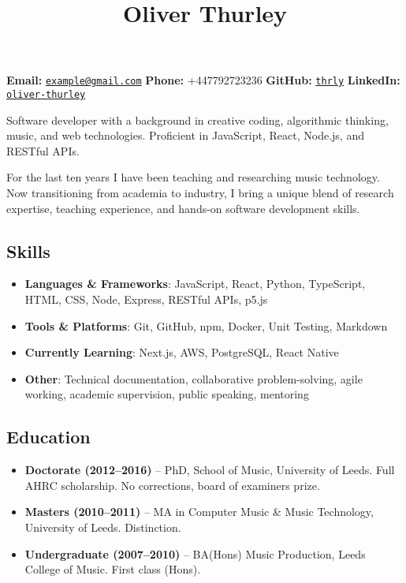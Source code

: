 \documentclass[11pt,a4paper]{article}
\title{\textcolor{devblue}{\large Oliver Thurley}}
\author{}
\date{}
\providecommand{\tightlist}{%
  \setlength{\itemsep}{0pt}\setlength{\parskip}{0pt}}
\begin{document}
\maketitle

\vspace{-1em}
\noindent\textbf{Email:} \href{mailto:example@gmail.com}{\texttt{example@gmail.com}} \hspace{1em}
\textbf{Phone:} +447792723236 \hspace{1em}
\textbf{GitHub:} \href{https://github.com/thrly}{\texttt{thrly}} \hspace{1em}
\textbf{LinkedIn:} \href{https://linkedin.com/in/oliver-thurley}{\texttt{oliver-thurley}}

\vspace{1em}

Software developer with a background in creative coding, algorithmic
thinking, music, and web technologies. Proficient in JavaScript, React,
Node.js, and RESTful APIs.

For the last ten years I have been teaching and researching music
technology. Now transitioning from academia to industry, I bring a
unique blend of research expertise, teaching experience, and hands-on
software development skills.

\subsection{Skills}\label{skills}

\begin{itemize}
\tightlist
\item
  \textbf{Languages \& Frameworks}: JavaScript, React, Python,
  TypeScript, HTML, CSS, Node, Express, RESTful APIs, p5.js
\item
  \textbf{Tools \& Platforms}: Git, GitHub, npm, Docker, Unit Testing,
  Markdown
\item
  \textbf{Currently Learning}: Next.js, AWS, PostgreSQL, React Native
\item
  \textbf{Other}: Technical documentation, collaborative
  problem-solving, agile working, academic supervision, public speaking,
  mentoring
\end{itemize}

\subsection{Education}\label{education}

\begin{itemize}
\tightlist
\item
  \textbf{Doctorate (2012--2016)} -- PhD, School of Music, University of
  Leeds. Full AHRC scholarship. No corrections, board of examiners
  prize.
\item
  \textbf{Masters (2010--2011)} -- MA in Computer Music \& Music
  Technology, University of Leeds. Distinction.
\item
  \textbf{Undergraduate (2007--2010)} -- BA(Hons) Music Production,
  Leeds College of Music. First class (Hons).
\end{itemize}
\end{document}
